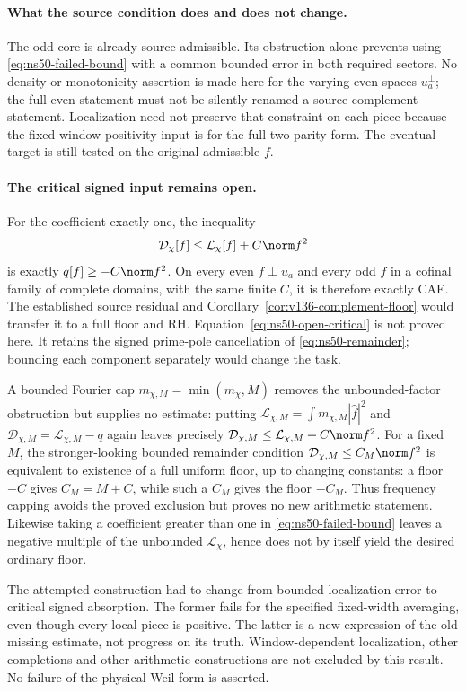 \paragraph{What the source condition does and does not change.}
The odd core is already source admissible. Its obstruction alone
prevents using \eqref{eq:ns50-failed-bound} with a common bounded
error in both required sectors. No density or monotonicity assertion
is made here for the varying even spaces $u_a^\perp$; the full-even
statement must not be silently renamed a source-complement statement.
Localization need not preserve that constraint on each piece because
the fixed-window positivity input is for the full two-parity form.
The eventual target is still tested on the original admissible $f$.

\paragraph{The critical signed input remains open.}
For the coefficient exactly one, the inequality
\begin{equation}\label{eq:ns50-open-critical}
 \mathcal D_\chi[f]\le\mathcal L_\chi[f]+C\norm f^2
\end{equation}
is exactly $q[f]\ge-C\norm f^2$. On every even
$f\perp u_a$ and every odd $f$ in a cofinal family of complete
domains, with the same finite $C$, it is therefore exactly CAE.
The established source residual and
Corollary~\ref{cor:v136-complement-floor} would transfer it to a
full floor and RH. Equation~\eqref{eq:ns50-open-critical} is not
proved here. It retains the signed prime-pole cancellation of
\eqref{eq:ns50-remainder}; bounding each component separately would
change the task.

A bounded Fourier cap $m_{\chi,M}=\min(m_\chi,M)$ removes the
unbounded-factor obstruction but supplies no estimate: putting
$\mathcal L_{\chi,M}=\int m_{\chi,M}|\widehat f|^2$ and
$\mathcal D_{\chi,M}=\mathcal L_{\chi,M}-q$ again leaves precisely
$\mathcal D_{\chi,M}\le\mathcal L_{\chi,M}+C\norm f^2$.
For a fixed $M$, the stronger-looking bounded remainder condition
$\mathcal D_{\chi,M}\le C_M\norm f^2$ is equivalent to existence
of a full uniform floor, up to changing constants: a floor $-C$
gives $C_M=M+C$, while such a $C_M$ gives the floor $-C_M$.
Thus frequency capping avoids the proved exclusion but proves no
new arithmetic statement. Likewise taking a coefficient greater
than one in \eqref{eq:ns50-failed-bound} leaves a negative multiple
of the unbounded $\mathcal L_\chi$, hence does not by itself yield
the desired ordinary floor.

The attempted construction had to change from bounded localization
error to critical signed absorption. The former fails for the
specified fixed-width averaging, even though every local piece is
positive. The latter is a new expression of the old missing estimate,
not progress on its truth. Window-dependent localization, other
completions and other arithmetic constructions are not excluded by
this result. No failure of the physical Weil form is asserted.
